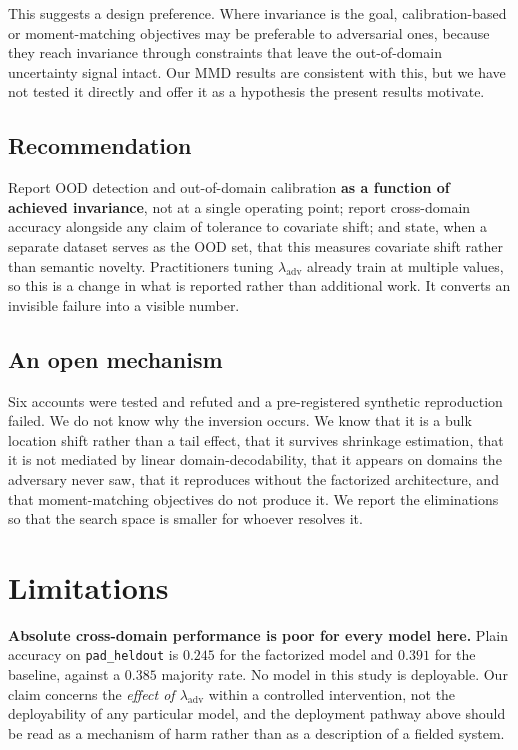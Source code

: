 \documentclass[11pt,a4paper]{article}
\newcommand{\lam}{\lambda_{\mathrm{adv}}}
\begin{document}
This suggests a design preference. Where invariance is the goal,
calibration-based or moment-matching objectives may be preferable to adversarial
ones, because they reach invariance through constraints that leave the
out-of-domain uncertainty signal intact. Our MMD results are consistent with
this, but we have not tested it directly and offer it as a hypothesis the
present results motivate.

\subsection{Recommendation}

Report OOD detection and out-of-domain calibration \textbf{as a function of
achieved invariance}, not at a single operating point; report cross-domain
accuracy alongside any claim of tolerance to covariate shift; and state, when a
separate dataset serves as the OOD set, that this measures covariate shift
rather than semantic novelty. Practitioners tuning $\lam$ already train at
multiple values, so this is a change in what is reported rather than additional
work. It converts an invisible failure into a visible number.

\subsection{An open mechanism}

Six accounts were tested and refuted and a pre-registered synthetic reproduction
failed. We do not know why the inversion occurs. We know that it is a bulk
location shift rather than a tail effect, that it survives shrinkage estimation,
that it is not mediated by linear domain-decodability, that it appears on
domains the adversary never saw, that it reproduces without the factorized
architecture, and that moment-matching objectives do not produce it. We report
the eliminations so that the search space is smaller for whoever resolves it.

\section{Limitations}

\textbf{Absolute cross-domain performance is poor for every model here.} Plain
accuracy on \texttt{pad\_heldout} is $0.245$ for the factorized model and
$0.391$ for the baseline, against a $0.385$ majority rate. No model in this
study is deployable. Our claim concerns the \emph{effect of $\lam$} within a
controlled intervention, not the deployability of any particular model, and the
deployment pathway above should be read as a mechanism of harm rather than as a
description of a fielded system.
\end{document}
